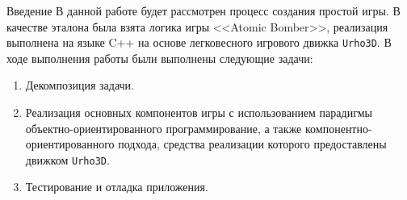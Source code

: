 \documentclass[a4paper, 14pt]{extarticle}
\begin{document}


\tableofcontents

\begin{anonsection}{Введение}
В данной работе будет рассмотрен процесс создания простой игры.
В качестве эталона была взята логика игры <<Atomic Bomber>>, реализация выполнена на языке C++ на основе легковесного игрового движка \verb|Urho3D|.
В ходе выполнения работы были выполнены следующие задачи:
\begin{enumerate}
\item Декомпозиция задачи.
\item Реализация основных компонентов игры с использованием парадигмы объектно-ориентированного программирование, а также компонентно-ориентированного подхода, средства реализации которого предоставлены движком \verb|Urho3D|.
\item Тестирование и отладка приложения.
\end{enumerate}

\end{anonsection}
\end{document}
